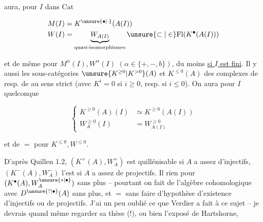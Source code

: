 
aura, pour $I$ dans $\mathrm{Cat}$

\[ \begin{aligned}
M(I)&=K^{\unsure{\bullet|\cdot}}(A(I))\\
W(I)&=\underbrace{W_{A(I)}}_{\text{quasi-isomorphismes}}\unsure{\subset|\in}\mathrm{Fl}(K^\bullet(A(I)))
\end{aligned} \]

et de même pour $M^\alpha(I),W^\alpha(I)$ $(\alpha\in\{+,-,b\})$, du moins \uline{si $I$ est fini}. Il y aussi les sous-catégories $\unsure{K^{\geq0}|K^{>0}}(A)$ et $K^{\leq0}(A)$ des complexes de  resp. de  au sens strict (avec $K^i=0$ si $i\geq0$, resp. si $i\leq0$). On aura pour $I$ quelconque

\[ \left\{\begin{aligned}
K^{\geq0}(A)(I)&\simeq K^{\geq0}(A(I))\\
W_A^{\geq0}(I)&=W_{A(I)}^{\geq0}
\end{aligned}\right. \]

et de $=$ pour $K^{\leq0},W^{\leq0}$.

D'après Quillen  1.2, $(K^+(A),W_A^+)$ est quillénisable si $A$ a assez d'injectifs, $(K^-(A),W_A^-)$ l'est si $A$ a assez de projectifs. Il  rien pour $(K^\bullet(A),W_A^{\unsure{*|\bullet}})$ sans plus -- pourtant on fait de l'algèbre cohomologique avec  $D^{\unsure{?|\bullet}}(A)$ sans plus, et $=$ sans faire d'hypothèse d'existence d'injectifs ou de projectifs. J'ai un peu oublié ce que Verdier a fait à ce sujet -- je devrais quand même regarder sa thèse (!), ou bien l'exposé de Hartshorne,
